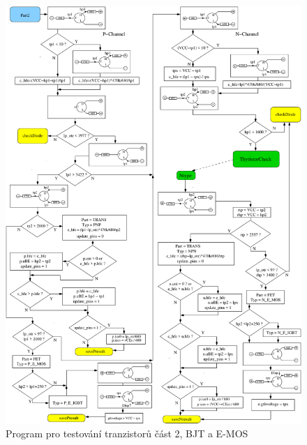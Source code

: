 \begin{figure}[H]
\centering
\includegraphics[]{../FIG/CheckSemi2.pdf}
\caption{Program pro testování tranzistorů část 2, BJT a E-MOS}
\label{fig:ChkSemi2}
\end{figure}

